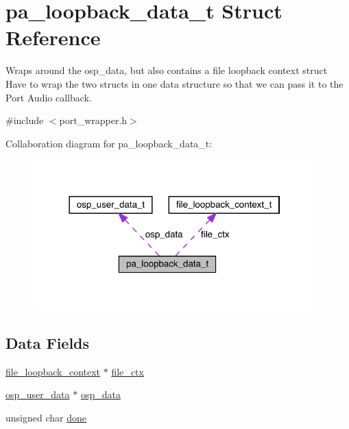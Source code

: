 \hypertarget{structpa__loopback__data__t}{}\section{pa\+\_\+loopback\+\_\+data\+\_\+t Struct Reference}
\label{structpa__loopback__data__t}


Wraps around the osp\+\_\+data, but also contains a file loopback context struct Have to wrap the two structs in one data structure so that we can pass it to the Port Audio callback.  




{\ttfamily \#include $<$port\+\_\+wrapper.\+h$>$}



Collaboration diagram for pa\+\_\+loopback\+\_\+data\+\_\+t\+:\nopagebreak
\begin{figure}[H]
\begin{center}
\leavevmode
\includegraphics[width=310pt]{structpa__loopback__data__t__coll__graph}
\end{center}
\end{figure}
\subsection*{Data Fields}
\begin{DoxyCompactItemize}
\item 
\mbox{\hyperlink{port__wrapper_8h_a44712da21c339df7c0735d4bab71a303}{file\+\_\+loopback\+\_\+context}} $\ast$ \mbox{\hyperlink{structpa__loopback__data__t_a42a73d3f67c2efae2ed630e67aa8fce9}{file\+\_\+ctx}}
\item 
\mbox{\hyperlink{constants_8h_a2d1d78531fe12807c3852488556d5a4b}{osp\+\_\+user\+\_\+data}} $\ast$ \mbox{\hyperlink{structpa__loopback__data__t_ac17ae97f5292d3ce42b8f35481df55e0}{osp\+\_\+data}}
\item 
unsigned char \mbox{\hyperlink{structpa__loopback__data__t_afcc199ddd9516cf9df956370e5c70482}{done}}
\end{DoxyCompactItemize}


